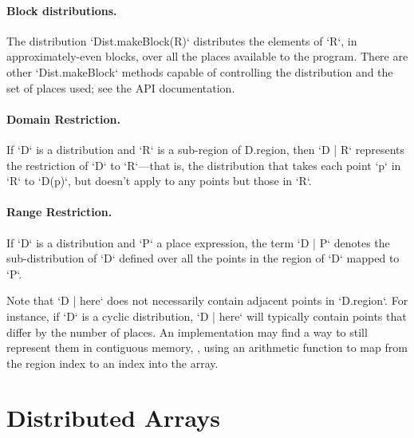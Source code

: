 \paragraph{Block distributions.}
The distribution \xcd`Dist.makeBlock(R)` distributes the elements of \xcd`R`,
in approximately-even blocks, over all the places available to the program. 
There are other \xcd`Dist.makeBlock` methods capable of controlling the
distribution and the set of places used; see the API documentation.


\paragraph{Domain Restriction.} 

If \xcd`D` is a distribution and \xcd`R` is a sub-region of {\cf
D.region}, then \xcd`D | R` represents the restriction of \xcd`D` to
\xcd`R`---that is, the distribution that takes each point \xcd`p` in \xcd`R`
to 
\xcd`D(p)`, 
but doesn't apply to any points but those in \xcd`R`.

\paragraph{Range Restriction.}

If \xcd`D` is a distribution and \xcd`P` a place expression, the term
\xcd`D | P` 
denotes the sub-distribution of \xcd`D` defined over all the
points in the region of \xcd`D` mapped to \xcd`P`.

Note that \xcd`D | here` does not necessarily contain adjacent points
in \xcd`D.region`. For instance, if \xcd`D` is a cyclic distribution,
\xcd`D | here` will typically contain points that differ by the number of
places. 
An implementation may find a
way to still represent them in contiguous memory, \eg, using an arithmetic
function to map from the region index to an index 
into the array.


\section{Distributed Arrays}

